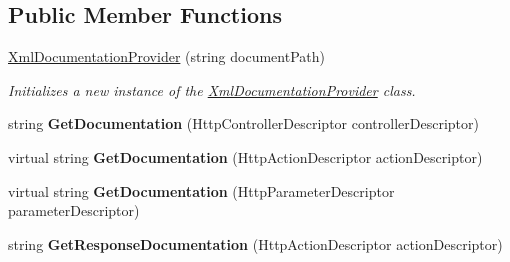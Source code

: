 \subsection*{Public Member Functions}
\begin{DoxyCompactItemize}
\item 
\hyperlink{class__1aarsproeve_web_service_1_1_areas_1_1_help_page_1_1_xml_documentation_provider_a9756d09583c49feedecafd710687979a}{Xml\+Documentation\+Provider} (string document\+Path)
\begin{DoxyCompactList}\small\item\em Initializes a new instance of the \hyperlink{class__1aarsproeve_web_service_1_1_areas_1_1_help_page_1_1_xml_documentation_provider}{Xml\+Documentation\+Provider} class. \end{DoxyCompactList}\item 
\hypertarget{class__1aarsproeve_web_service_1_1_areas_1_1_help_page_1_1_xml_documentation_provider_aa8ff5033f41ffc32d11bade7e90f2b02}{}string {\bfseries Get\+Documentation} (Http\+Controller\+Descriptor controller\+Descriptor)\label{class__1aarsproeve_web_service_1_1_areas_1_1_help_page_1_1_xml_documentation_provider_aa8ff5033f41ffc32d11bade7e90f2b02}

\item 
\hypertarget{class__1aarsproeve_web_service_1_1_areas_1_1_help_page_1_1_xml_documentation_provider_a86a2db2502a18844835c4e791cff515d}{}virtual string {\bfseries Get\+Documentation} (Http\+Action\+Descriptor action\+Descriptor)\label{class__1aarsproeve_web_service_1_1_areas_1_1_help_page_1_1_xml_documentation_provider_a86a2db2502a18844835c4e791cff515d}

\item 
\hypertarget{class__1aarsproeve_web_service_1_1_areas_1_1_help_page_1_1_xml_documentation_provider_a7e613b152b4a84f07f42fcc7f98adb4a}{}virtual string {\bfseries Get\+Documentation} (Http\+Parameter\+Descriptor parameter\+Descriptor)\label{class__1aarsproeve_web_service_1_1_areas_1_1_help_page_1_1_xml_documentation_provider_a7e613b152b4a84f07f42fcc7f98adb4a}

\item 
\hypertarget{class__1aarsproeve_web_service_1_1_areas_1_1_help_page_1_1_xml_documentation_provider_a17f3f9c11da4dc397b6e4702d554eca0}{}string {\bfseries Get\+Response\+Documentation} (Http\+Action\+Descriptor action\+Descriptor)\label{class__1aarsproeve_web_service_1_1_areas_1_1_help_page_1_1_xml_documentation_provider_a17f3f9c11da4dc397b6e4702d554eca0}


\end{DoxyCompactItemize}
